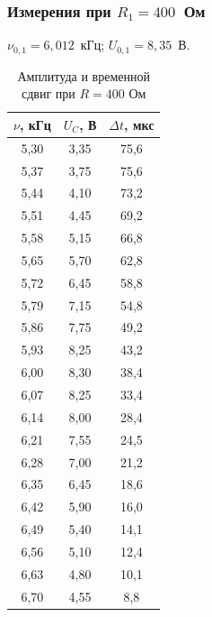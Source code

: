 \documentclass[a4paper,14pt]{extarticle}
\begin{document}
\subsubsection*{Измерения при $R_1=400$~Ом}
\noindent $\nu_{0,1}=6{,}012$~кГц; $U_{0,1}=8{,}35$~В.
\begin{table}[H]
\centering
\small
\caption{Амплитуда и временной сдвиг
при $R=400$ Ом}
\begin{tabular}{ccc}
\toprule
$\nu$, кГц & $U_C$, В & $\Delta t$, мкс \\
\midrule
5,30 & 3,35 & 75,6 \\
5,37 & 3,75 & 75,6 \\
5,44 & 4,10 & 73,2 \\
5,51 & 4,45 & 69,2 \\
5,58 & 5,15 & 66,8 \\
5,65 & 5,70 & 62,8 \\
5,72 & 6,45 & 58,8 \\
5,79 & 7,15 & 54,8 \\
5,86 & 7,75 & 49,2 \\
5,93 & 8,25 & 43,2 \\
6,00 & 8,30 & 38,4 \\
6,07 & 8,25 & 33,4 \\
6,14 & 8,00 & 28,4 \\
6,21 & 7,55 & 24,5 \\
6,28 & 7,00 & 21,2 \\
6,35 & 6,45 & 18,6 \\
6,42 & 5,90 & 16,0 \\
6,49 & 5,40 & 14,1 \\
6,56 & 5,10 & 12,4 \\
6,63 & 4,80 & 10,1 \\
6,70 & 4,55 & 8,8  \\
\bottomrule
\end{tabular}
\end{table}

\newpage
\end{document}
